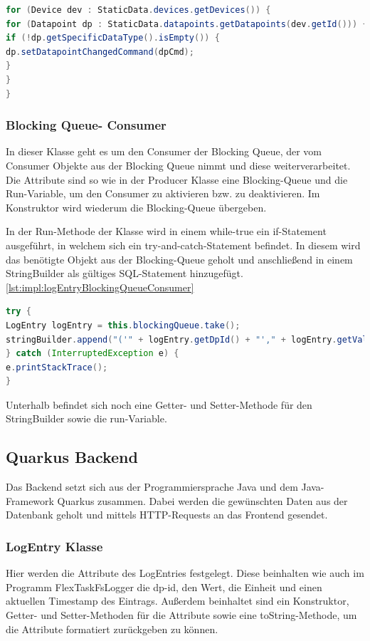 \begin{lstlisting}[language=java,caption=Datenpunkte des jeweiligen Geräts iterieren,label=lst:impl:datenpunkteIterieren]
for (Device dev : StaticData.devices.getDevices()) {
for (Datapoint dp : StaticData.datapoints.getDatapoints(dev.getId())) {
if (!dp.getSpecificDataType().isEmpty()) {
dp.setDatapointChangedCommand(dpCmd);
}
}
}
\end{lstlisting}


\subsubsection{Blocking Queue- Consumer }
In dieser Klasse geht es um den Consumer der Blocking Queue, der vom Consumer Objekte aus der Blocking Queue nimmt und diese weiterverarbeitet. Die Attribute sind so wie in der Producer Klasse eine Blocking-Queue und die Run-Variable, um den Consumer zu aktivieren bzw. zu deaktivieren. Im Konstruktor wird wiederum die Blocking-Queue übergeben.


In der Run-Methode der Klasse wird in einem while-true ein if-Statement ausgeführt, in welchem sich ein try-and-catch-Statement befindet. In diesem wird das benötigte Objekt aus der Blocking-Queue geholt und anschließend in einem StringBuilder als gültiges SQL-Statement hinzugefügt. \ref{lst:impl:logEntryBlockingQueueConsumer}


\begin{lstlisting}[language=java,caption=Daten aus der BlockingQueue herausnehmen,label=lst:impl:logEntryBlockingQueueConsumer]
try {
LogEntry logEntry = this.blockingQueue.take();
stringBuilder.append("('" + logEntry.getDpId() + "'," + logEntry.getValue() + "," + "'A'," + logEntry.getTimeStamp() + "),");
} catch (InterruptedException e) {
e.printStackTrace();
}
\end{lstlisting}


Unterhalb befindet sich noch eine Getter- und Setter-Methode für den StringBuilder sowie die run-Variable.


\subsection{Quarkus Backend}
Das Backend setzt sich aus der Programmiersprache Java und dem Java-Framework Quarkus zusammen. Dabei werden die gewünschten Daten aus der Datenbank geholt und mittels HTTP-Requests an das Frontend gesendet.


\subsubsection{LogEntry Klasse}
Hier werden die Attribute des LogEntries festgelegt. Diese beinhalten wie auch im Programm FlexTaskFsLogger die dp-id, den Wert, die Einheit und einen aktuellen Timestamp des Eintrags.
Außerdem beinhaltet sind ein Konstruktor, Getter- und Setter-Methoden für die Attribute sowie eine toString-Methode, um die Attribute formatiert zurückgeben zu können.


